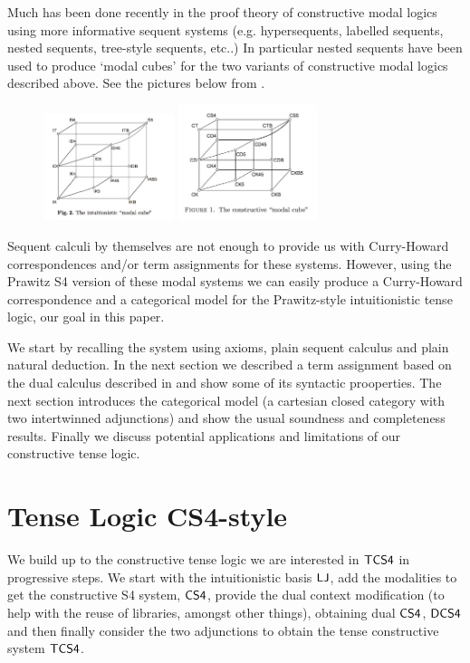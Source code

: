 \documentclass{article}
\begin{document}
Much has been done recently in the proof theory of constructive modal logics using more informative sequent systems (e.g. hypersequents, labelled sequents, nested sequents, tree-style sequents, etc..) In particular nested sequents have been used to produce `modal cubes' for the two variants of constructive modal logics described above. See the pictures below from \cite{arisaka2015,strasburger2013}.

\begin{figure}[h!]
\centering
\includegraphics[width=1.5in]{intmodalcube.pdf}
\includegraphics[width=1.6in]{constructivemodalcube.pdf}
\label{fig:modalcube}
\end{figure}

Sequent calculi  by themselves are not enough to provide us with Curry-Howard correspondences and/or term assignments for these systems. However, using the Prawitz S4 version of these modal systems we can easily produce a Curry-Howard correspondence and a categorical model for the Prawitz-style intuitionistic tense logic, our goal in this paper. 

We start by recalling the system using axioms, plain sequent calculus and plain natural deduction. In the next section we described a term assignment based on the dual calculus described in \cite{icalp1998} and show some of its syntactic prooperties. The next section  introduces the categorical model (a cartesian closed category with two intertwinned adjunctions) and show the usual soundness and completeness results. Finally we discuss potential applications and  limitations of our constructive tense logic.

\section{Tense Logic CS4-style}
We build up to the constructive tense logic we are interested in $\sf{TCS4}$ in progressive steps. We start with the intuitionistic basis $\sf{LJ}$, add the modalities to get the constructive S4 system, $\sf{CS4}$, provide the dual context modification (to help with the reuse of libraries, amongst other things), obtaining dual $\sf{CS4}$, $\sf{DCS4}$ and then finally consider the two adjunctions to obtain the tense constructive system $\sf{TCS4}$.
\end{document}
